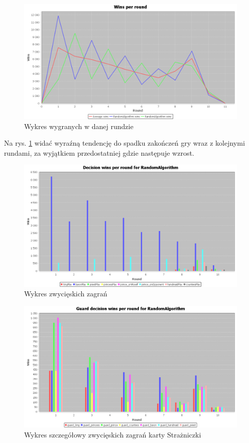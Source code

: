 \begin{figure}[H]
	\centering
	\includegraphics[width=\textwidth]{Resources/RVsR/RVsRroundwin.PNG}
	\caption{Wykres wygranych w danej rundzie} 
	\label{fig:RVsRroundwin}
\end{figure}

Na rys. \ref{fig:RVsRroundwin} widać wyraźną tendencję do spadku zakończeń gry wraz z kolejnymi rundami, za wyjątkiem przedostatniej gdzie następuje wzrost.

\clearpage
\begin{figure}[H]
	\centering
	\includegraphics[width=\textwidth]{Resources/RVsR/RVsRdecision.PNG}
	\caption{Wykres zwycięskich zagrań} 
	\label{fig:RVsRdecision}
\end{figure} 

\begin{figure}[H]
	\centering
	\includegraphics[width=\textwidth]{Resources/RVsR/RVsRguarddecision.PNG}
	\caption{Wykres szczegółowy zwycięskich zagrań karty Strażniczki} 
	\label{fig:RVsRguarddecision}
\end{figure}

